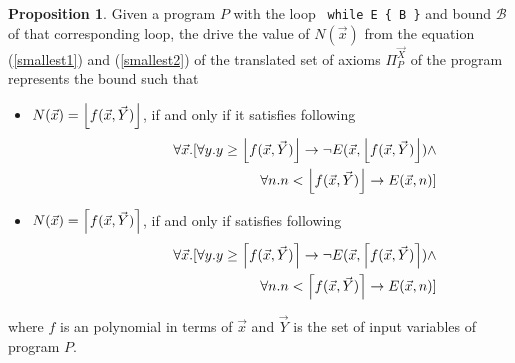 \documentclass[12pt]{extarticle}
\DeclarePairedDelimiter\ceil{\lceil}{\rceil}
\DeclarePairedDelimiter\floor{\lfloor}{\rfloor}
\theoremstyle{definition}
\newtheorem{proposition}[theorem]{Proposition}
\begin{document}
\begin{proposition}\label{propos4}Given a program $P$ with the loop \verb- while E { B }-  and bound $\mathcal{B}$ of that corresponding loop, the drive the value of $N(\vec{x})$  from the equation (\ref{smallest1}) and (\ref{smallest2}) of the translated set of axioms $\Pi_{P}^{\vec{X}}$ of the program represents the bound such that 
\begin{itemize}
    \item $N(\vec{x})=\floor*{f(\vec{x},\vec{Y})}$, if and only if it satisfies following
    \begin{eqnarray}
    &&\hspace*{-4em}\forall \vec{x}.[\forall y.y\geq \floor*{f(\vec{x},\vec{Y})} \rightarrow \neg E(\vec{x},\floor*{f(\vec{x},\vec{Y})}) \land \nonumber\\
    &&\hspace*{10em}\forall n. n< \floor*{f(\vec{x},\vec{Y})}\rightarrow  E(\vec{x},n)] \label{smallest5}
   \end{eqnarray}
    
    \item $N(\vec{x})=\ceil*{f(\vec{x},\vec{Y})}$, if and only if satisfies following
    \begin{eqnarray}
    &&\hspace*{-4em}\forall \vec{x}.[\forall y.y\geq \ceil*{f(\vec{x},\vec{Y})} \rightarrow \neg E(\vec{x},\ceil*{f(\vec{x},\vec{Y})}) \land \nonumber\\
    &&\hspace*{10em}\forall n. n< \ceil*{f(\vec{x},\vec{Y})}\rightarrow  E(\vec{x},n)]\label{smallest6}
   \end{eqnarray}
\end{itemize}
where $f$ is an polynomial in terms of $\vec{x}$ and $\vec{Y}$ is the set of input variables of program $P$.

\end{proposition}
\end{document}

